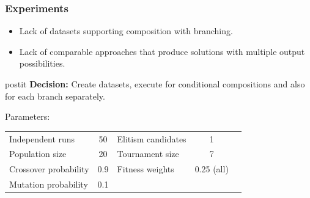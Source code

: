\documentclass[xcolor={table}]{beamer}
\begin{document}
\begin{frame}
\frametitle{Experiments}
\begin{itemize}
 \item Lack of datasets supporting composition with branching.
 \item Lack of comparable approaches that produce solutions with multiple output possibilities.
\end{itemize}

\begin{beamercolorbox}[sep=1em]{postit}
\textbf{Decision:} Create datasets, execute for conditional compositions and also for each branch separately.
\end{beamercolorbox}

Parameters:
\begin{table}
\footnotesize
\def\arraystretch{1.5}
\begin{tabular}{|l|c|lcl}
\cline{1-4}
Independent runs      & 50  & \multicolumn{1}{l|}{Elitism candidates} & \multicolumn{1}{c|}{1}          &  \\ \cline{1-4}
Population size       & 20  & \multicolumn{1}{l|}{Tournament size}    & \multicolumn{1}{c|}{7}          &  \\ \cline{1-4}
Crossover probability & 0.9 & \multicolumn{1}{l|}{Fitness weights}    & \multicolumn{1}{c|}{0.25 (all)} &  \\ \cline{1-4}
Mutation probability  & 0.1 &                                         & \multicolumn{1}{l}{}            &  \\ \cline{1-2}
\end{tabular}
\end{table}

\end{frame}

\end{document}
